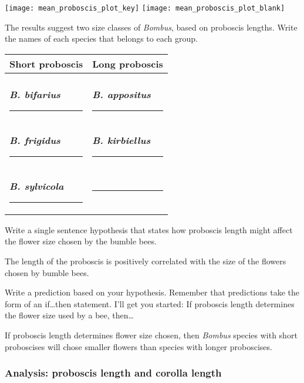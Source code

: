 \documentclass[12pt, hidelinks, twoside]{exam}
\newcommand*\AnswerBox[2]{%
    \parbox[t][#1]{0.92\textwidth}{%
    \begin{solution}#2\end{solution}}
    \vspace{\stretch{1}}
}
\begin{document}
\begin{questions}
\ifprintanswers
	\texttt{[image: mean\_proboscis\_plot\_key]}
\else
	\texttt{[image: mean\_proboscis\_plot\_blank]}
\fi



\question
The results suggest two size classes of \textit{Bombus}, based on
proboscis lengths.  Write the names of each species that belongs to 
each group.

\begin{tabular}{@{}ll@{}} %
	\toprule
	Short proboscis & Long proboscis \tabularnewline
	\midrule
	& \tabularnewline
	\ifprintanswers \textbf{\textit{B. bifarius}} \else \rule{2in}{0.4pt} \fi &
	\ifprintanswers \textbf{\textit{B. appositus}} \else \rule{2in}{0.4pt} \fi 
	\tabularnewline[2em]
	\ifprintanswers \textbf{\textit{B. frigidus}} \else \rule{2in}{0.4pt} \fi &
	\ifprintanswers \textbf{\textit{B. kirbiellus}} \else \rule{2in}{0.4pt} \fi
	\tabularnewline[2em]
	\ifprintanswers \textbf{\textit{B. sylvicola}} \else \rule{2in}{0.4pt} \fi &
	\rule{1in}{0.4pt} \tabularnewline
	\bottomrule
\end{tabular}


\bigskip

\question
Write a single sentence hypothesis that states how proboscis length might affect the flower size chosen by the bumble bees.

\AnswerBox{2\baselineskip}{The length of the proboscis is positively correlated with the size	of the flowers chosen by bumble bees.}

\question
Write a prediction based on your hypothesis. Remember that predictions take the form of an if\dots then statement. I'll get you started: If proboscis length determines the flower size used by a bee, then\dots

\AnswerBox{3\baselineskip}{If proboscis length determines flower size chosen, then \textit{Bombus} species with short proboscises will chose smaller flowers than species with longer proboscises.}


\subsubsection*{Analysis: proboscis length and corolla length}\label{sec:proboscis_flower_length}


\end{questions}
\end{document}
